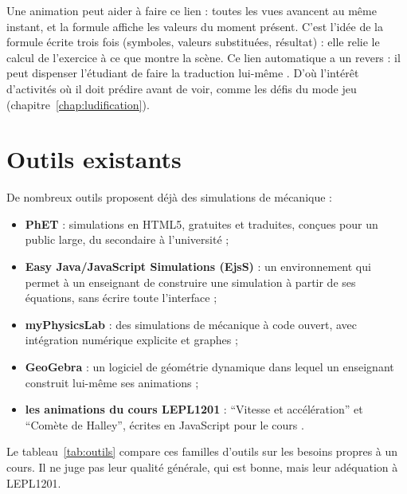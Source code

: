 Une animation peut aider à faire ce lien : toutes les vues avancent au même
instant, et la formule affiche les valeurs du moment présent. C'est l'idée de
la formule écrite trois fois (symboles, valeurs substituées, résultat) : elle
relie le calcul de l'exercice à ce que montre la scène. Ce lien automatique a
un revers : il peut dispenser l'étudiant de faire la traduction lui-même
\cite{ainsworth2006deft}. D'où l'intérêt d'activités où il doit prédire avant
de voir, comme les défis du mode jeu (chapitre~\ref{chap:ludification}).

\section{Outils existants}

De nombreux outils proposent déjà des simulations de mécanique :
\begin{itemize}
  \item \textbf{PhET} : simulations en HTML5, gratuites et traduites,
        conçues pour un public large, du secondaire à l'université
        \cite{phet_site} ;
  \item \textbf{Easy Java/JavaScript Simulations (EjsS)} : un environnement
        qui permet à un enseignant de construire une simulation à partir de
        ses équations, sans écrire toute l'interface \cite{esquembre2004ejs} ;
  \item \textbf{myPhysicsLab} : des simulations de mécanique à code ouvert,
        avec intégration numérique explicite et graphes \cite{myphysicslab} ;
  \item \textbf{GeoGebra} : un logiciel de géométrie dynamique dans lequel un
        enseignant construit lui-même ses animations \cite{geogebra} ;
  \item \textbf{les animations du cours LEPL1201} : \enquote{Vitesse et
        accélération} et \enquote{Comète de Halley}, écrites en JavaScript
        pour le cours \cite{zoulab_epl1201}.
\end{itemize}

Le tableau~\ref{tab:outils} compare ces familles d'outils sur les besoins
propres à un cours. Il ne juge pas leur qualité générale, qui est bonne, mais
leur adéquation à LEPL1201.

